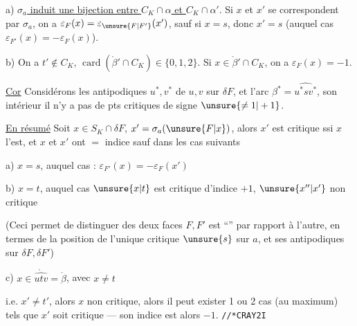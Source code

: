 a)  \uline{\(\sigma_a\) induit une bijection entre \(C_K\cap\alpha\) et \(C_K\cap\alpha'\)}.
Si \(x\) et \(x'\) se correspondent par \(\sigma_a\), on a \(\varepsilon_F(x)=\varepsilon_{\unsure{F|F'}}(x')\), sauf si \(x=s\), donc \(x'=s\) (auquel cas \(\varepsilon_{F'}(x)=-\varepsilon_F(x)\)).

b) On a \(t'\notin C_K\),  \(\operatorname{card}(\mathring{\beta}'\cap C_K)\)\(\in\{0,1,2\}\).
 Si \(x\in\mathring{\beta}'\cap C_K\), on a \(\varepsilon_F(x)=-1\).

\uline{Cor} Considérons les antipodiques \(u^*,v^*\) de \(u,v\) sur \(\delta F\), et l'arc \(\beta^*=\widehat{u^*sv^*}\),   son intérieur il n'y a pas de pts critiques de signe \(\unsure{\ne1|+1}\).

\uline{En résumé} Soit \(x\in S_K\cap\delta F\),  \(x'=\sigma_a(\unsure{F|x})\), alors \(x'\) est critique ssi \(x\) l'est, et \(x\) et \(x'\) ont $=$ indice sauf dans les cas suivants

a) \(x=s\), auquel cas : \(\varepsilon_{F'}(x)=-\varepsilon_F(x')\)

b) \(x=t\), auquel cas  \(\unsure{x|t}\) est critique d'indice \(+1\), \(\unsure{x''|x'}\) non critique

(Ceci permet de distinguer  des deux faces \(F,F'\) est ``'' par rapport à l'autre, en termes de la position de l'unique critique \(\unsure{s}\) sur \(a\), et ses  antipodiques sur \(\delta F,\delta F'\))

c) \(x\in\mathring{\widehat{utv}}=\mathring{\beta}\), avec \(x\ne t\)

i.e. \(x'\ne t'\), alors \(x\) non critique, alors il peut exister 1 ou 2 cas (au maximum) tels que \(x'\) soit critique --- son indice est alors \(-1\).
\texttt{//*\quad CRAY2\qquad I}

